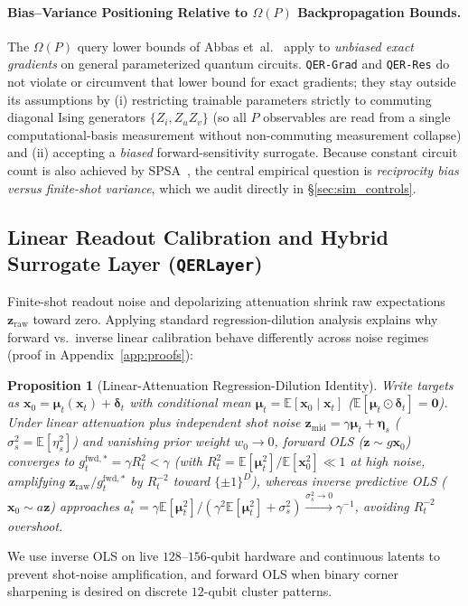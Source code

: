 \documentclass[11pt]{article}
\newtheorem{proposition}{Proposition}
\begin{document}
\paragraph{Bias--Variance Positioning Relative to $\Omega(P)$ Backpropagation Bounds.}
The $\Omega(P)$ query lower bounds of Abbas et~al.~\cite{abbas2023qbp} apply to \emph{unbiased exact gradients} on general parameterized quantum circuits. \texttt{QER-Grad} and \texttt{QER-Res} do not violate or circumvent that lower bound for exact gradients; they stay outside its assumptions by (i) restricting trainable parameters strictly to commuting diagonal Ising generators $\{Z_i, Z_u Z_v\}$ (so all $P$ observables are read from a single computational-basis measurement without non-commuting measurement collapse) and (ii) accepting a \emph{biased} forward-sensitivity surrogate. Because constant circuit count is also achieved by SPSA~\cite{spall1992spsa}, the central empirical question is \emph{reciprocity bias versus finite-shot variance}, which we audit directly in \S\ref{sec:sim_controls}.

\subsection{Linear Readout Calibration and Hybrid Surrogate Layer (\texttt{QERLayer})}
\label{sec:cal_layer}
Finite-shot readout noise and depolarizing attenuation shrink raw expectations $\mathbf{z}_{\text{raw}}$ toward zero. Applying standard regression-dilution analysis explains why forward vs.\ inverse linear calibration behave differently across noise regimes (proof in Appendix~\ref{app:proofs}):

\begin{proposition}[Linear-Attenuation Regression-Dilution Identity]
\label{prop:dilution}
Write targets as $\mathbf{x}_0 = \boldsymbol{\mu}_t(\mathbf{x}_t)+\boldsymbol{\delta}_t$ with conditional mean $\boldsymbol{\mu}_t=\mathbb{E}[\mathbf{x}_0\mid\mathbf{x}_t]$ ($\mathbb{E}[\boldsymbol{\mu}_t\odot\boldsymbol{\delta}_t]{=}\mathbf{0}$). Under linear attenuation plus independent shot noise $\mathbf{z}_{\text{mid}} = \gamma\boldsymbol{\mu}_t+\boldsymbol{\eta}_s$ ($\sigma_s^2{=}\mathbb{E}[\eta_s^2]$) and vanishing prior weight $w_0{\to}0$, forward OLS ($\mathbf{z}\sim g\mathbf{x}_0$) converges to $g_t^{\text{fwd},*}=\gamma R_t^2 < \gamma$ (with $R_t^2=\mathbb{E}[\boldsymbol{\mu}_t^2]/\mathbb{E}[\mathbf{x}_0^2]\ll 1$ at high noise, amplifying $\mathbf{z}_{\text{raw}}/g_t^{\text{fwd},*}$ by $R_t^{-2}$ toward $\{\pm 1\}^D$), whereas inverse predictive OLS ($\mathbf{x}_0\sim a\mathbf{z}$) approaches $a_t^* = \gamma\mathbb{E}[\boldsymbol{\mu}_t^2]/(\gamma^2\mathbb{E}[\boldsymbol{\mu}_t^2]+\sigma_s^2)\xrightarrow{\sigma_s^2\to 0}\gamma^{-1}$, avoiding $R_t^{-2}$ overshoot.
\end{proposition}
We use inverse OLS on live $128$--$156$-qubit hardware and continuous latents to prevent shot-noise amplification, and forward OLS when binary corner sharpening is desired on discrete $12$-qubit cluster patterns.
\end{document}
